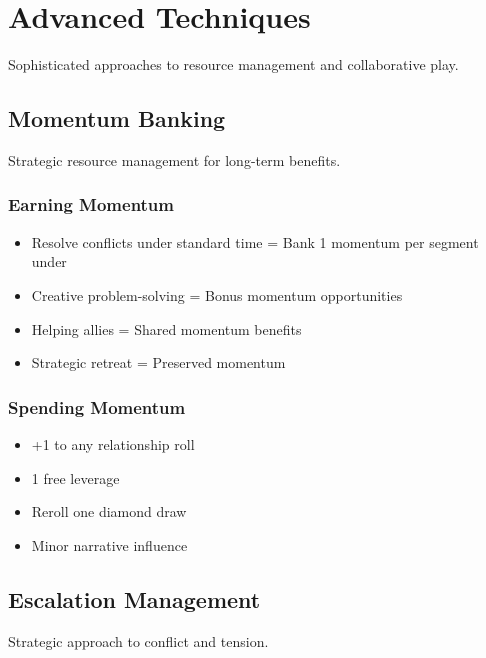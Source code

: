 \section{Advanced Techniques}

Sophisticated approaches to resource management and collaborative play.

\subsection{Momentum Banking}

Strategic resource management for long-term benefits.

\subsubsection{Earning Momentum}

\begin{itemize}
\item Resolve conflicts under standard time = Bank 1 momentum per segment under
\item Creative problem-solving = Bonus momentum opportunities
\item Helping allies = Shared momentum benefits
\item Strategic retreat = Preserved momentum
\end{itemize}

\subsubsection{Spending Momentum}

\begin{itemize}
\item +1 to any relationship roll
\item 1 free leverage
\item Reroll one diamond draw
\item Minor narrative influence
\end{itemize}

\subsection{Escalation Management}

Strategic approach to conflict and tension.

